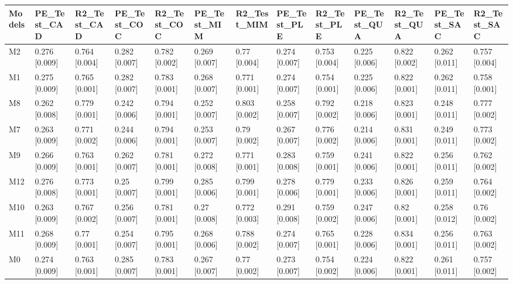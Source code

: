 \begin{table}[ht]
\centering
\begin{tabular}{lllllllllllll}
  \hline
Models & PE\_Test\_CAD & R2\_Test\_CAD & PE\_Test\_COC & R2\_Test\_COC & PE\_Test\_MIM & R2\_Test\_MIM & PE\_Test\_PLE & R2\_Test\_PLE & PE\_Test\_QUA & R2\_Test\_QUA & PE\_Test\_SAC & R2\_Test\_SAC \\ 
  \hline
M2 & 0.276 [0.009] & 0.764 [0.004] & 0.282 [0.007] & 0.782 [0.002] & 0.269 [0.007] & 0.77 [0.004] & 0.274 [0.007] & 0.753 [0.004] & 0.225 [0.006] & 0.822 [0.002] & 0.262 [0.011] & 0.757 [0.004] \\ 
  M1 & 0.275 [0.009] & 0.765 [0.001] & 0.282 [0.007] & 0.783 [0.001] & 0.268 [0.007] & 0.771 [0.001] & 0.274 [0.007] & 0.754 [0.001] & 0.225 [0.006] & 0.822 [0.001] & 0.262 [0.011] & 0.758 [0.001] \\ 
  M8 & 0.262 [0.008] & 0.779 [0.001] & 0.242 [0.006] & 0.794 [0.001] & 0.252 [0.007] & 0.803 [0.002] & 0.258 [0.007] & 0.792 [0.002] & 0.218 [0.006] & 0.823 [0.001] & 0.248 [0.011] & 0.777 [0.002] \\ 
  M7 & 0.263 [0.009] & 0.771 [0.002] & 0.244 [0.006] & 0.794 [0.001] & 0.253 [0.007] & 0.79 [0.002] & 0.267 [0.007] & 0.776 [0.002] & 0.214 [0.006] & 0.831 [0.001] & 0.249 [0.011] & 0.773 [0.002] \\ 
  M9 & 0.266 [0.009] & 0.763 [0.001] & 0.262 [0.007] & 0.781 [0.001] & 0.272 [0.008] & 0.771 [0.001] & 0.283 [0.008] & 0.759 [0.001] & 0.241 [0.006] & 0.822 [0.001] & 0.256 [0.011] & 0.762 [0.002] \\ 
  M12 & 0.276 [0.008] & 0.773 [0.001] & 0.25 [0.007] & 0.799 [0.001] & 0.285 [0.006] & 0.799 [0.001] & 0.278 [0.006] & 0.779 [0.001] & 0.233 [0.006] & 0.826 [0.001] & 0.259 [0.011] & 0.764 [0.002] \\ 
  M10 & 0.263 [0.009] & 0.767 [0.002] & 0.256 [0.007] & 0.781 [0.001] & 0.27 [0.008] & 0.772 [0.003] & 0.291 [0.008] & 0.759 [0.002] & 0.247 [0.006] & 0.82 [0.001] & 0.258 [0.012] & 0.76 [0.002] \\ 
  M11 & 0.268 [0.009] & 0.77 [0.001] & 0.254 [0.007] & 0.795 [0.001] & 0.268 [0.006] & 0.788 [0.002] & 0.274 [0.007] & 0.765 [0.001] & 0.228 [0.006] & 0.834 [0.001] & 0.256 [0.011] & 0.763 [0.002] \\ 
  M0 & 0.274 [0.009] & 0.763 [0.001] & 0.285 [0.007] & 0.783 [0.001] & 0.267 [0.007] & 0.77 [0.002] & 0.273 [0.007] & 0.754 [0.002] & 0.224 [0.006] & 0.822 [0.001] & 0.261 [0.011] & 0.757 [0.002] \\ 
   \hline
\end{tabular}
\end{table}
